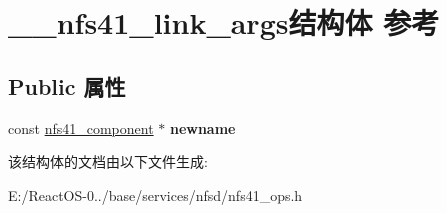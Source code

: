 \hypertarget{struct____nfs41__link__args}{}\section{\+\_\+\+\_\+nfs41\+\_\+link\+\_\+args结构体 参考}
\label{struct____nfs41__link__args}
\subsection*{Public 属性}
\begin{DoxyCompactItemize}
\item 
\mbox{\label{struct____nfs41__link__args_a2aca47f82e1a1bbb7d27b03f055a31b6}} 
const \hyperlink{struct____nfs41__component}{nfs41\+\_\+component} $\ast$ {\bfseries newname}
\end{DoxyCompactItemize}


该结构体的文档由以下文件生成\+:\begin{DoxyCompactItemize}
\item 
E\+:/\+React\+O\+S-\/0../base/services/nfsd/nfs41\+\_\+ops.\+h\end{DoxyCompactItemize}
